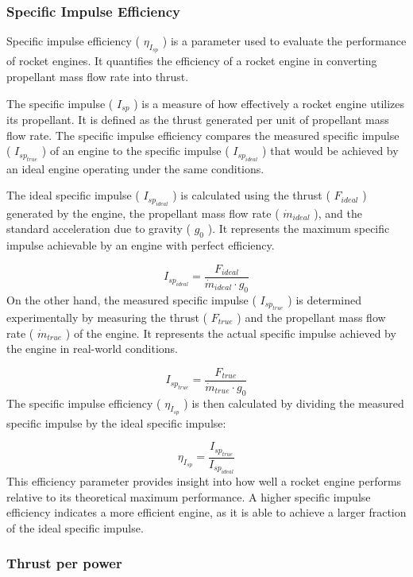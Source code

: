 \documentclass{homework}
\begin{document}
\begin{multicols}{2}
\subsubsection{Specific Impulse Efficiency}
		    
		  Specific impulse efficiency ( $\eta_{I_{sp}}$ ) is a parameter used to evaluate the performance of rocket engines. It quantifies the efficiency of a rocket engine in converting propellant mass flow rate into thrust.  
		    
		  The specific impulse ( $I_{sp}$ ) is a measure of how effectively a rocket engine utilizes its propellant. It is defined as the thrust generated per unit of propellant mass flow rate. The specific impulse efficiency compares the measured specific impulse ( $I_{sp_{true}}$ ) of an engine to the specific impulse ( $I_{sp_{ideal}}$ ) that would be achieved by an ideal engine operating under the same conditions.  
		    
		  The ideal specific impulse ( $I_{sp_{ideal}}$ ) is calculated using the thrust ( $F_{ideal}$ ) generated by the engine, the propellant mass flow rate ( $\dot{m}_{ideal}$ ), and the standard acceleration due to gravity ( $g_0$ ). It represents the maximum specific impulse achievable by an engine with perfect efficiency.  
		    
$$
		  I_{sp_{ideal}} = \frac{F_{ideal}}{\dot{m}_{ideal} \cdot g_0}
		  $$ 		    
		  On the other hand, the measured specific impulse ( $I_{sp_{true}}$ ) is determined experimentally by measuring the thrust ( $F_{true}$ ) and the propellant mass flow rate ( $\dot{m}_{true}$ ) of the engine. It represents the actual specific impulse achieved by the engine in real-world conditions.  
		    
$$
		  I_{sp_{true}} = \frac{F_{true}}{\dot{m}_{true} \cdot g_0}
		  $$ 		    
		  The specific impulse efficiency ( $\eta_{I_{sp}}$ ) is then calculated by dividing the measured specific impulse by the ideal specific impulse:  
		    
$$
		  \eta_{I_{sp}} = \frac{I_{sp_{true}}}{I_{sp_{ideal}}}
		  $$ 		    
		  This efficiency parameter provides insight into how well a rocket engine performs relative to its theoretical maximum performance. A higher specific impulse efficiency indicates a more efficient engine, as it is able to achieve a larger fraction of the ideal specific impulse.  
\subsubsection{Thrust per power}
		    

\end{multicols}
\end{document}
